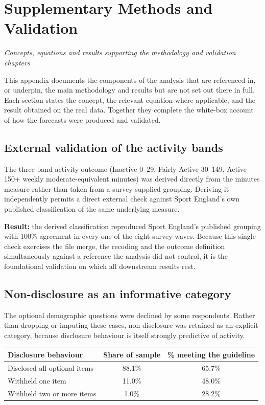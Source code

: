 \documentclass[ %
                    author={Ashrey Ashrey, Sanya Kapoor, Trisha Sharma, Yash Bhooshan Pandloskar},
                supervisor={Dr. Dalila O’Grady},
                    degree={MSc},
                     title={Using machine learning to forecast physical activity participation, volunteering and activity patterns in London},
                  subtitle={},
                      type={},
                      year={2021}]{dissertation}
\begin{document}
\appendix

\chapter{Supplementary Methods and Validation}
\label{appx:supplementary-methods}

\noindent
\emph{Concepts, equations and results supporting the methodology and validation chapters}

\noindent
This appendix documents the components of the analysis that are referenced in, or underpin, the main methodology and results but are not set out there in full. Each section states the concept, the relevant equation where applicable, and the result obtained on the real data. Together they complete the white-box account of how the forecasts were produced and validated.

\section{External validation of the activity bands}

\noindent
The three-band activity outcome (Inactive 0--29, Fairly Active 30--149, Active 150+ weekly moderate-equivalent minutes) was derived directly from the minutes measure rather than taken from a survey-supplied grouping. Deriving it independently permits a direct external check against Sport England's own published classification of the same underlying measure.

\noindent
\textbf{Result:} the derived classification reproduced Sport England's published grouping with 100\% agreement in every one of the eight survey waves. Because this single check exercises the file merge, the recoding and the outcome definition simultaneously against a reference the analysis did not control, it is the foundational validation on which all downstream results rest.

\section{Non-disclosure as an informative category}

\noindent
The optional demographic questions were declined by some respondents. Rather than dropping or imputing these cases, non-disclosure was retained as an explicit category, because disclosure behaviour is itself strongly predictive of activity.

\begin{table}[!htb]
\centering
\begin{tabular}{lcc}
\toprule
\textbf{Disclosure behaviour} & \textbf{Share of sample} & \textbf{\% meeting the guideline} \\
\midrule
Disclosed all optional items & 88.1\% & 65.7\% \\
Withheld one item & 11.0\% & 48.0\% \\
Withheld two or more items & 1.0\% & 28.2\% \\
\bottomrule
\end{tabular}
\end{table}
\end{document}
